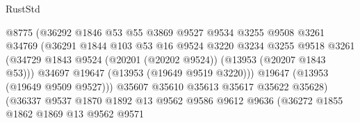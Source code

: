 \begin{lexlean}{RustStd}
\begin{coremodule}
                                      @8775
                                      (@36292
                                        @1846
                                        @53
                                        @55
                                        @3869
                                        @9527
                                        @9534
                                        @3255
                                        @9508
                                        @3261
                                        @34769
                                        (@36291
                                          @1844
                                          @103
                                          @53
                                          @16
                                          @9524
                                          @3220
                                          @3234
                                          @3255
                                          @9518
                                          @3261
                                          (@34729
                                            @1843
                                            @9524
                                            (@20201 (@20202 @9524))
                                            (@13953 (@20207 @1843 @53)))
                                          @34697
                                          @19647
                                          (@13953 (@19649 @9519 @3220)))
                                        @19647
                                        (@13953 (@19649 @9509 @9527)))
                                      @35607
                                      @35610
                                      @35613
                                      @35617
                                      @35622
                                      @35628)
                                    (@36337
                                      @9537
                                      @1870
                                      @1892
                                      @13
                                      @9562
                                      @9586
                                      @9612
                                      @9636
                                      (@36272
                                        @1855
                                        @1862
                                        @1869
                                        @13
                                        @9562
                                        @9571

\end{coremodule}
\end{lexlean}
